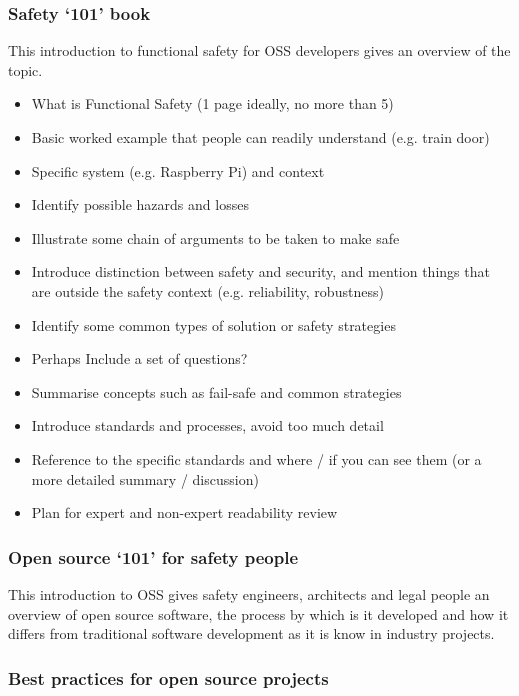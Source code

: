 \documentclass[12pt]{../Common_files/ElisaPaper}
\begin{document}
\subsubsection{Safety ‘101’ book}
This introduction to functional safety for OSS developers gives an overview of the topic.
\begin{itemize}	
\item What is Functional Safety (1 page ideally, no more than 5)
\item Basic worked example that people can readily understand (e.g. train door)
\item Specific system (e.g. Raspberry Pi) and context
\item Identify possible hazards and losses
\item Illustrate some chain of arguments to be taken to make safe
\item Introduce distinction between safety and security, and mention things that are outside the safety context (e.g. reliability, robustness)
\item Identify some common types of solution or safety strategies
\item Perhaps Include a set of questions?
\item Summarise concepts such as fail-safe and common strategies 
\item Introduce standards and processes, avoid too much detail
\item Reference to the specific standards and where / if you can see them (or a more detailed summary / discussion)
\item Plan for expert and non-expert readability review
\end{itemize}


\subsubsection{Open source ‘101’ for safety people}
This introduction to OSS gives safety engineers, architects and legal people an overview of open source software, the process by which is it developed and how it differs from traditional software development as it is know in industry projects.

\subsubsection{Best practices for open source projects}
\end{document}
